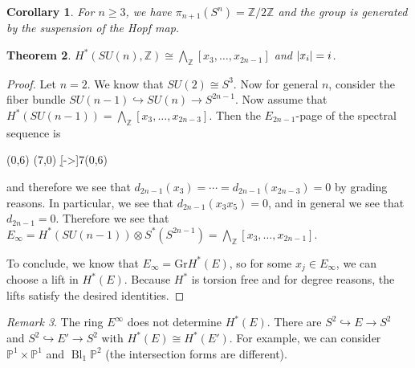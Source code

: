 \documentclass[leqno, openany]{memoir}
\newtheorem{thm}{Theorem}[section]
\newtheorem{cor}[thm]{Corollary}
\theoremstyle{definition}
\theoremstyle{remark}
\newtheorem{rmk}[thm]{Remark}
\theoremstyle{plain}
\theoremstyle{definition}
\theoremstyle{remark}
\newcommand{\Z}{\mathbb{Z}}
\renewcommand{\P}{\mathbb{P}}
\newcommand{\mr}[1]{\mathrm{#1}}
\begin{document}
\begin{cor}
    For $n \geq 3$, we have $\pi_{n+1}(S^n) = \Z/2\Z$ and the group is generated by the suspension of the Hopf map.
\end{cor}

\begin{thm}
    $H^*(SU(n), \Z) \cong \bigwedge_{\Z}[x_3, \ldots, x_{2n-1}]$ and $\abs{x_i} = i$.
\end{thm}

\begin{proof}
    Let $n = 2$. We know that $SU(2) \cong S^3$. Now for general $n$, consider the fiber bundle $SU(n-1) \hookrightarrow SU(n) \to S^{2n-1}$. Now assume that $H^*(SU(n-1)) = \bigwedge_{\Z} [x_3, \ldots, x_{2n-3}]$. Then the $E_{2n-1}$-page of the spectral sequence is
    \begin{center}
    \begin{sseqdata}[name=sun, classes = {draw=none}, cohomological Serre grading, y axis gap = 4em, x axis extend end = 4em]
        \class["H^*(SU(n-1))"](0,6)
        \class["H^*(SU(n-1))"](7,0)
        \d[->]7(0,6)
    \end{sseqdata}
    \printpage[name=sun, page=7, grid=chess]
    \end{center}
    and therefore we see that $d_{2n-1}(x_3) = \cdots = d_{2n-1}(x_{2n-3}) = 0$ by grading reasons. In particular, we see that $d_{2n-1}(x_3 x_5) = 0$, and in general we see that $d_{2n-1} = 0$. Therefore we see that $E_{\infty} = H^*(SU(n-1)) \otimes S^*(S^{2n-1}) = \bigwedge_{\Z} [x_3, \ldots, x_{2n-1}]$.

    To conclude, we know that $E_{\infty} = \mr{Gr} H^*(E)$, so for some $x_j \in E_{\infty}$, we can choose a lift in $H^*(E)$. Because $H^*$ is torsion free and for degree reasons, the lifts satisfy the desired identities.
\end{proof}

\begin{rmk}
    The ring $E^{\infty}$ does not determine $H^*(E)$. There are $S^2 \hookrightarrow E \to S^2$ and $S^2 \hookrightarrow E' \to S^2$ with $H^*(E) \cong H^*(E')$. For example, we can consider $\P^1 \times \P^1$ and $\operatorname{Bl}_1 \P^2$ (the intersection forms are different).
\end{rmk}
\end{document}
